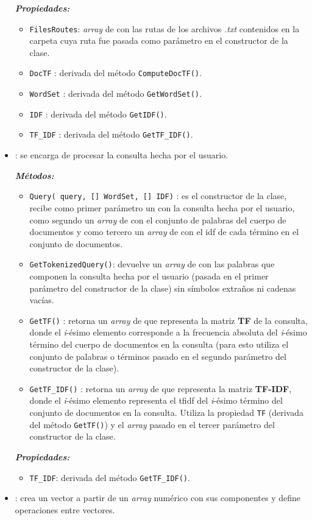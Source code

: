 \documentclass{article}
\begin{document}
\begin{itemize}
\begin{itemize}
\end{itemize}
\textit{\textbf{Propiedades:}}
\begin{itemize}
\item \texttt{FilesRoutes}: \textit{array} de  con las rutas de los archivos \textit{.txt} contenidos en la carpeta cuya ruta fue pasada como parámetro en el constructor de la clase.
\item \texttt{DocTF} : derivada del método \texttt{ComputeDocTF()}.
\item \texttt{WordSet} : derivada del método \texttt{GetWordSet()}.
\item \texttt{IDF} : derivada del método \texttt{GetIDF()}.
\item \texttt{TF\_IDF} : derivada del método \texttt{GetTF\_IDF()}.
\end{itemize}
\item  {} : se encarga de procesar la consulta hecha por el usuario.

\textit{\textbf{Métodos:}}
\begin{itemize}
\item \texttt{Query( query, [] WordSet, [] IDF)} : es el constructor de la clase, recibe como primer parámetro un  con la consulta hecha por el usuario, como segundo un \textit{array} de  con el conjunto de palabras del cuerpo de documentos y como tercero un \textit{array} de  con el idf de cada término en el conjunto de documentos.
\item \texttt{GetTokenizedQuery()}: devuelve un \textit{array} de  con las palabras que componen la consulta hecha por el usuario (pasada en el primer parámetro del constructor de la clase) sin símbolos extraños ni cadenas vacías.
\item \texttt{GetTF()} : retorna un \textit{array} de  que representa la matriz \textbf{TF} de la consulta, donde el \textit{i}-ésimo elemento corresponde a la frecuencia absoluta del \textit{i}-ésimo término del cuerpo de documentos en la consulta (para esto utiliza el conjunto de palabras o términos pasado en el segundo parámetro del constructor de la clase).
\item \texttt{GetTF\_IDF()} : retorna un \textit{array} de  que representa la matriz \textbf{TF-IDF}, donde el \textit{i}-ésimo elemento representa el tfidf del \textit{i}-ésimo término del conjunto de documentos en la consulta. Utiliza la propiedad \texttt{TF} (derivada del método \texttt{GetTF()}) y el \textit{array} pasado en el tercer parámetro del constructor de la clase.
\end{itemize}
\textbf{\textit{Propiedades:}}
\begin{itemize}
\item \texttt{TF\_IDF}: derivada del método \texttt{GetTF\_IDF()}.
\end{itemize}
\item {} : crea un vector a partir de un \textit{array} numérico con sus componentes y define operaciones entre vectores.


\end{itemize}
\end{document}
